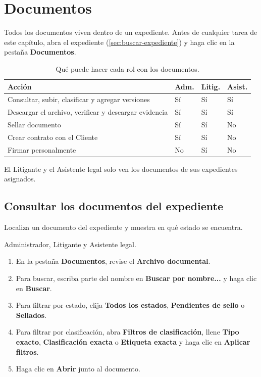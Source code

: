 \chapter{Documentos}\label{cap:documentos}

Todos los documentos viven dentro de un expediente. Antes de cualquier tarea
de este capítulo, abra el expediente (\cref{sec:buscar-expediente}) y haga
clic en la pestaña \textbf{Documentos}.

\begin{table}[H]
  \centering
  \caption{Qué puede hacer cada rol con los documentos.}\label{tab:permisos-documentos}
  \begin{tabularx}{\textwidth}{Y C{1.4cm} C{1.4cm} C{1.4cm}}
    \toprule
    \textbf{Acción} & \textbf{Adm.} & \textbf{Litig.} & \textbf{Asist.} \\
    \midrule
    Consultar, subir, clasificar y agregar versiones & Sí & Sí & Sí \\
    Descargar el archivo, verificar y descargar evidencia & Sí & Sí & Sí \\
    Sellar documento & Sí & Sí & No \\
    Crear contrato con el Cliente & Sí & Sí & No \\
    Firmar personalmente & No & Sí & No \\
    \bottomrule
  \end{tabularx}
\end{table}

El Litigante y el Asistente legal solo ven los documentos de sus expedientes
asignados.

\section{Consultar los documentos del expediente}\label{sec:consultar-documentos}

\paraque Localiza un documento del expediente y muestra en qué estado se
encuentra.

\disponible Administrador, Litigante y Asistente legal.

\pasos
\begin{enumerate}
  \item En la pestaña \textbf{Documentos}, revise el \textbf{Archivo documental}.
  \item Para buscar, escriba parte del nombre en \textbf{Buscar por nombre...}
        y haga clic en \textbf{Buscar}.
  \item Para filtrar por estado, elija \textbf{Todos los estados},
        \textbf{Pendientes de sello} o \textbf{Sellados}.
  \item Para filtrar por clasificación, abra \textbf{Filtros de clasificación},
        llene \textbf{Tipo exacto}, \textbf{Clasificación exacta} o
        \textbf{Etiqueta exacta} y haga clic en \textbf{Aplicar filtros}.
  \item Haga clic en \textbf{Abrir} junto al documento.
\end{enumerate}

